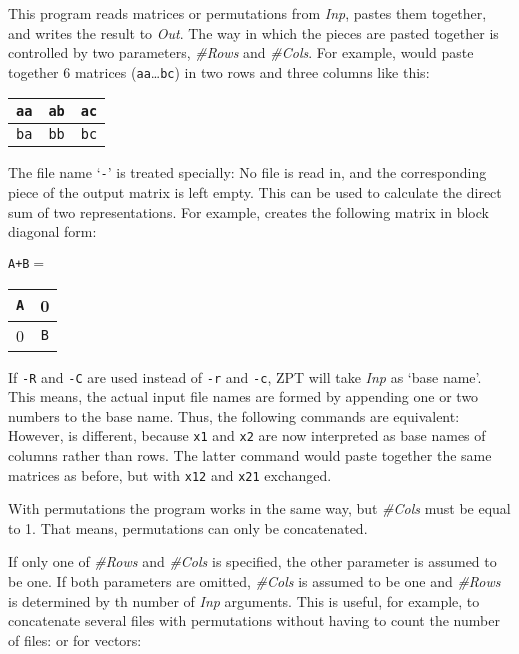 \Description
This program reads matrices or permutations from {\it Inp},
pastes them together, and writes the result to {\it Out}. The
way in which the pieces are pasted together is controlled by
two parameters, {\it \#Rows} and {\it \#Cols}. For example,
would paste together 6 matrices ({\tt aa}\ldots{\tt bc}) in two
rows and three columns like this:
\begin{center}
\begin{tabular}{|c|c|c|}
\hline
{\tt aa} & {\tt ab} & {\tt ac} \\
\hline
{\tt ba} & {\tt bb} & {\tt bc} \\
\hline
\end{tabular}
\end{center}
The file name `{\tt -}' is treated specially: No file is read in,
and the corresponding piece of the output matrix is left empty. This
can be used to calculate the direct sum of two representations. For
example,
creates the following matrix in block diagonal form:
\begin{center}
{\tt A+B}$=$\begin{tabular}{|c|c|}
\hline
{\tt A} & 0 \\
\hline
0 & {\tt B} \\
\hline
\end{tabular}
\end{center}

If {\tt -R} and {\tt -C} are used instead of {\tt -r} and {\tt -c},
ZPT will take {\it Inp} as `base name'. This means, the actual
input file names are formed by appending one or two numbers to
the base name. Thus, the following commands are equivalent:
However,
is different, because {\tt x1} and {\tt x2} are now interpreted as
base names of columns rather than rows. The latter command would
paste together the same matrices as before, but with {\tt x12} and
{\tt x21} exchanged.

With permutations the program works in the same way, but {\it \#Cols}
must be equal to 1. That means, permutations can only be concatenated.

If only one of {\it \#Rows} and {\it \#Cols} is specified, the other
parameter is assumed to be one. If both parameters are omitted,
{\it \#Cols} is assumed to be one and {\it \#Rows} is determined by
th number of {\it Inp} arguments. This is useful, for example,
to concatenate several files with permutations without having to
count the number of files:
or for vectors:


